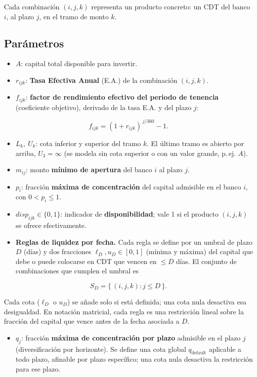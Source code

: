 \documentclass[11pt,a4paper]{article}
\begin{document}
Cada combinación $(i, j, k)$ representa un producto concreto: un CDT del banco $i$, al plazo $j$, en el tramo de monto $k$.

\subsection{Parámetros}

\begin{itemize}
  \item $A$: capital total disponible para invertir.
  \item $r_{ijk}$: \textbf{Tasa Efectiva Anual} (E.A.) de la combinación $(i, j, k)$.
  \item $f_{ijk}$: \textbf{factor de rendimiento efectivo del periodo de tenencia} (coeficiente objetivo), derivado de la tasa E.A. y del plazo $j$:
\end{itemize}

\[
f_{ijk} = (1 + r_{ijk})^{\,j/360} - 1 .
\]

\begin{itemize}
  \item $L_k,\ U_k$: cota inferior y superior del tramo $k$. El último tramo es abierto por arriba, $U_3 = \infty$ (se modela sin cota superior o con un valor grande, p.\,ej. $A$).
  \item $m_{ij}$: monto \textbf{mínimo de apertura} del banco $i$ al plazo $j$.
  \item $p_i$: fracción \textbf{máxima de concentración} del capital admisible en el banco $i$, con $0 < p_i \le 1$.
  \item $disp_{ijk} \in \{0, 1\}$: indicador de \textbf{disponibilidad}; vale 1 si el producto $(i, j, k)$ se ofrece efectivamente.
  \item \textbf{Reglas de liquidez por fecha.} Cada regla se define por un umbral de plazo $D$ (días) y dos fracciones $\ell_D, u_D \in [0, 1]$ (mínima y máxima) del capital que debe o puede colocarse en CDT que vencen en $\le D$ días. El conjunto de combinaciones que cumplen el umbral es
\end{itemize}

\[
S_D = \{\, (i, j, k) : j \le D \,\}.
\]

Cada cota ($\ell_D$ o $u_D$) se añade solo si está definida; una cota nula desactiva esa desigualdad. En notación matricial, cada regla es una restricción lineal sobre la fracción del capital que vence antes de la fecha asociada a $D$.

\begin{itemize}
  \item $q_j$: fracción \textbf{máxima de concentración por plazo} admisible en el plazo $j$ (diversificación por horizonte). Se define una cota global $q_{\text{default}}$ aplicable a todo plazo, afinable por plazo específico; una cota nula desactiva la restricción para ese plazo.
\end{itemize}
\end{document}
